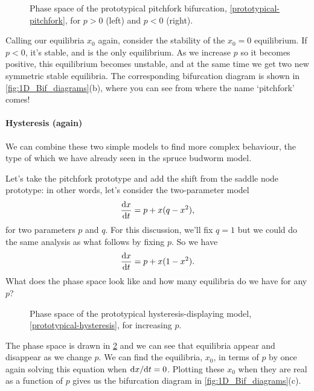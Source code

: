 \documentclass[main.tex]{subfiles}
\begin{document}
\begin{figure}
	\centering
	\qquad
	
	\caption{Phase space of the prototypical pitchfork bifurcation, \cref{prototypical-pitchfork}, for $p>0$ (left) and $p<0$ (right).}
	\label{fig:pitchfork-phase}
\end{figure}

Calling our equilibria $x_0$ again, consider the stability of the $x_0=0$ equilibrium. If $p<0$, it's stable, and is the only equilibrium. As we increase $p$ so it becomes positive, this equilibrium becomes unstable, and at the same time we get two new symmetric stable equilibria. The corresponding bifurcation diagram is shown in \cref{fig:1D_Bif_diagrams}(b), where you can see from where the name `pitchfork' comes! 

\paragraph{Hysteresis (again)}
We can combine these two simple models to find more complex behaviour, the type of which we have already seen in the spruce budworm model.

Let's take the pitchfork prototype and add the shift from the saddle node prototype: in other words, let's consider the two-parameter model
\begin{equation}
	\fd{x}{t} = p + x(q-x^2),
\end{equation}
for two parameters $p$ and $q$. For this discussion, we'll fix $q=1$ but we could do the same analysis as what follows by fixing $p$. So we have
\begin{equation}
	\label{prototypical-hysteresis}
	\fd{x}{t} = p + x(1-x^2).
\end{equation}
What does the phase space look like and how many equilibria do we have for any $p$?

\begin{figure}
	\centering
	
	\caption{Phase space of the prototypical hysteresis-displaying model, \cref{prototypical-hysteresis}, for increasing $p$.}
	\label{fig:hysteresis-prototype-phase}
\end{figure}

The phase space is drawn in \cref{fig:hysteresis-prototype-phase} and we can see that equilibria appear and disappear as we change $p$. We can find the equilibria, $x_0$, in terms of $p$ by once again solving this equation when $\fd{x}{t}=0$. Plotting these $x_0$ when they are real as a function of $p$ gives us the bifurcation diagram in \cref{fig:1D_Bif_diagrams}(c).
\end{document}
